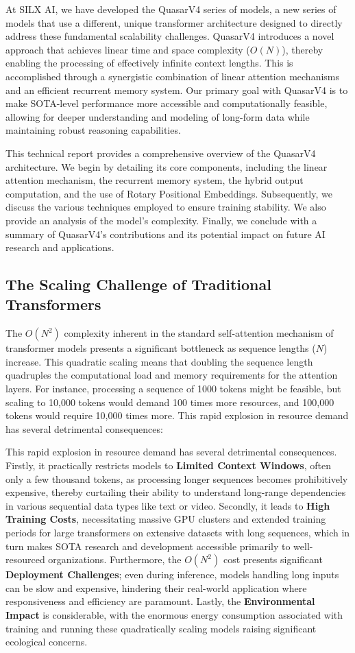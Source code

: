 \documentclass{article}
\begin{document}
At SILX AI, we have developed the QuasarV4 series of models, a new series of models that use a different, unique transformer architecture designed to directly address these fundamental scalability challenges. QuasarV4 introduces a novel approach that achieves linear time and space complexity ($O(N)$), thereby enabling the processing of effectively infinite context lengths. This is accomplished through a synergistic combination of linear attention mechanisms and an efficient recurrent memory system. Our primary goal with QuasarV4 is to make SOTA-level performance more accessible and computationally feasible, allowing for deeper understanding and modeling of long-form data while maintaining robust reasoning capabilities.

This technical report provides a comprehensive overview of the QuasarV4 architecture. We begin by detailing its core components, including the linear attention mechanism, the recurrent memory system, the hybrid output computation, and the use of Rotary Positional Embeddings. Subsequently, we discuss the various techniques employed to ensure training stability. We also provide an analysis of the model's complexity. Finally, we conclude with a summary of QuasarV4's contributions and its potential impact on future AI research and applications.

\subsection{The Scaling Challenge of Traditional Transformers}
The $O(N^2)$ complexity inherent in the standard self-attention mechanism of transformer models presents a significant bottleneck as sequence lengths ($N$) increase. This quadratic scaling means that doubling the sequence length quadruples the computational load and memory requirements for the attention layers. For instance, processing a sequence of 1000 tokens might be feasible, but scaling to 10,000 tokens would demand 100 times more resources, and 100,000 tokens would require 10,000 times more. This rapid explosion in resource demand has several detrimental consequences:

This rapid explosion in resource demand has several detrimental consequences. Firstly, it practically restricts models to \textbf{Limited Context Windows}, often only a few thousand tokens, as processing longer sequences becomes prohibitively expensive, thereby curtailing their ability to understand long-range dependencies in various sequential data types like text or video. Secondly, it leads to \textbf{High Training Costs}, necessitating massive GPU clusters and extended training periods for large transformers on extensive datasets with long sequences, which in turn makes SOTA research and development accessible primarily to well-resourced organizations. Furthermore, the $O(N^2)$ cost presents significant \textbf{Deployment Challenges}; even during inference, models handling long inputs can be slow and expensive, hindering their real-world application where responsiveness and efficiency are paramount. Lastly, the \textbf{Environmental Impact} is considerable, with the enormous energy consumption associated with training and running these quadratically scaling models raising significant ecological concerns.
\end{document}
